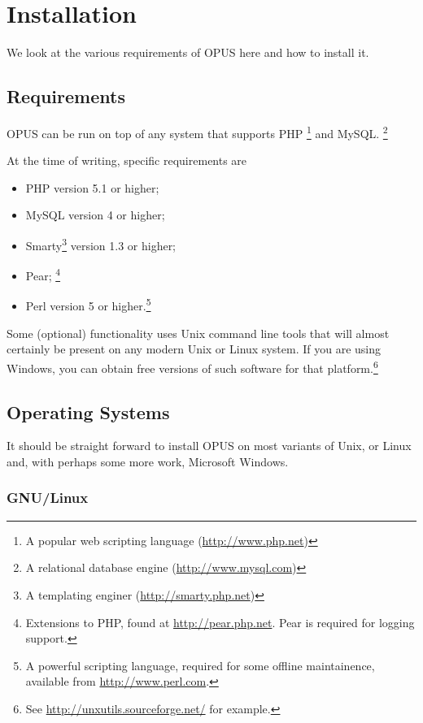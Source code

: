 \documentclass[12 pt]{book}
\begin{document}
\chapter{Installation}

We look at the various requirements of OPUS here and how to install it.

\section{Requirements}

OPUS can be run on top of  any system that supports PHP%
\footnote{A popular web scripting language (\url{http://www.php.net})} and MySQL.%
\footnote{A relational database engine (\url{http://www.mysql.com})}

At the time of writing, specific requirements are
\begin{itemize}
  \item PHP version 5.1 or higher;
  \item MySQL version 4 or higher;
  \item Smarty\footnote{A templating enginer (\url{http://smarty.php.net})} version 1.3 or higher;
  \item Pear;%
    \footnote{Extensions to PHP, found at \url{http://pear.php.net}. Pear is required for logging support.}
  \item Perl version 5 or higher.\footnote{A powerful scripting language, required for some offline maintainence, available from \url{http://www.perl.com}.}
\end{itemize}

Some (optional) functionality uses Unix command line tools that will almost certainly be present on
any modern Unix or Linux system. If you are using Windows, you can obtain free versions of such
software for that platform.\footnote{See \url{http://unxutils.sourceforge.net/} for example.}

\section{Operating Systems}

It should be straight forward to install OPUS on most variants of Unix, or Linux and, with perhaps some more work, Microsoft Windows.

\subsection{GNU/Linux}
\end{document}
